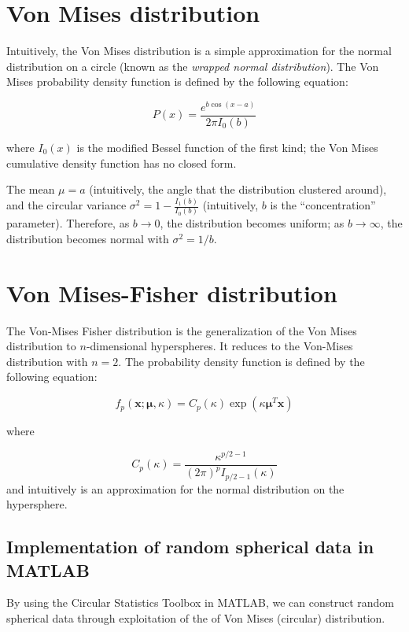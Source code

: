 \documentclass[../tech_report_1.tex]{subfiles}
\begin{document}
\section{Von Mises distribution}

Intuitively, the Von Mises distribution  \cite{wolfram_von_mises} is
a simple approximation for the normal distribution on a circle (known
as the \textit{wrapped normal distribution}). The Von Mises probability
density function is defined by the following equation:

\[
P(x)=\frac{{e^{b\cos(x-a)}}}{2\pi I_{0}(b)}
\]


where $I_{0}(x)$ is the modified Bessel function of the first kind;
the Von Mises cumulative density function has no closed form.

The mean $\mu=a$ (intuitively, the angle that the distribution clustered
around), and the circular variance $\sigma^{2}=1-\frac{{I_{1}(b)}}{I_{0}(b)}$
(intuitively, $b$ is the ``concentration'' parameter). Therefore,
as $b\rightarrow0$, the distribution becomes uniform; as $b\rightarrow\infty$,
the distribution becomes normal with $\sigma^{2}=1/b$.


\section{Von Mises-Fisher distribution}

The Von-Mises Fisher distribution is the generalization of the Von
Mises distribution to $n$-dimensional hyperspheres. It reduces to
the Von-Mises distribution with $n=2$. The probability density function
is defined by the following equation:

\[
f_{p}(\boldsymbol{x};\boldsymbol{\mu},\kappa)=C_{p}(\kappa)\exp(\kappa\boldsymbol{\mu}^{T}\boldsymbol{x})
\]


where

\[
C_{p}(\kappa)=\frac{\kappa^{p/2-1}}{(2\pi)^{p}I_{p/2-1}(\kappa)}
\]
 and intuitively is an approximation for the normal distribution on
the hypersphere.

\subsection{Implementation of random spherical data in MATLAB}

By using the Circular Statistics Toolbox in MATLAB, we can construct random spherical data through exploitation of the of Von Mises (circular) distribution.
\end{document}
